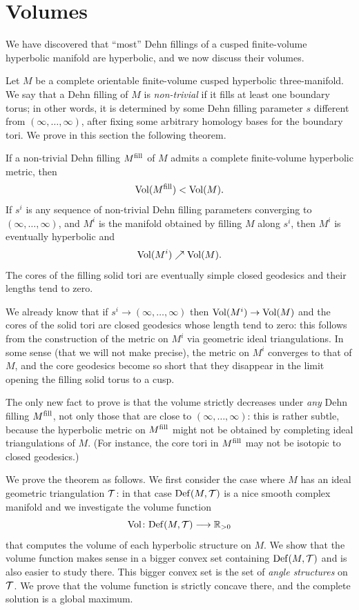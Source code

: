 \section{Volumes}
We have discovered that ``most'' Dehn fillings of a cusped finite-volume hyperbolic manifold are hyperbolic, and we now discuss their volumes.

Let $M$ be a complete orientable finite-volume cusped hyperbolic three-manifold. We say that  a Dehn filling of $M$ is \emph{non-trivial} if it fills at least one boundary torus; in other words, it is determined by some Dehn filling parameter $s$ different from $(\infty, \ldots, \infty)$, after fixing some arbitrary homology bases for the boundary tori. We prove in this section the following theorem. 

\begin{teo} \label{vol:vol:teo}
If a non-trivial Dehn filling $M^{\rm fill}$ of $M$ admits a complete finite-volume hyperbolic metric, then
$${\rm Vol}(M^{\rm fill}) < {\rm Vol}(M).$$
If $s^i$ is any sequence of non-trivial Dehn filling parameters converging to $(\infty,\ldots, \infty)$, and $M^i$ is the manifold obtained by filling $M$ along $s^i$, then $M^i$ is eventually hyperbolic and
$${\rm Vol} (M^i) \nearrow {\rm Vol}(M).$$
The cores of the filling solid tori are eventually simple closed geodesics and their lengths tend to zero.
\end{teo}

We already know that if $s^i \to (\infty, \ldots, \infty)$ then ${\rm Vol}(M^i) \to {\rm Vol}(M)$ and the cores of the solid tori are closed geodesics whose length tend to zero: this follows from the construction of the metric on $M^i$ via geometric ideal triangulations. In some sense (that we will not make precise), the metric on $M^i$ converges to that of $M$, and the core geodesics become so short that they disappear in the limit opening the filling solid torus to a cusp.

The only new fact to prove is that the volume strictly decreases under \emph{any} Dehn filling $M^{\rm fill}$, not only those that are close to $(\infty, \ldots, \infty)$: this is rather subtle, because the hyperbolic metric on $M^{\rm fill}$ might not be obtained by completing ideal triangulations of $M$. (For instance, the core tori in $M^{\rm fill}$ may not be isotopic to closed geodesics.)

We prove the theorem as follows. We first consider the case where $M$ has an ideal geometric triangulation $\mathcal{T}$: in that case ${\rm Def}(M,\mathcal{T})$ is a nice smooth complex manifold and we investigate the volume function 
$${\rm Vol}\colon {\rm Def}(M,\mathcal{T}) \longrightarrow \mathbb{R}_{>0}$$
that computes the volume of each hyperbolic structure on $M$. We show that the volume function makes sense in a bigger convex set containing ${\rm Def}(M,\mathcal{T})$ and is also easier to study there. This bigger convex set is the set of \emph{angle structures} on $\mathcal{T}$. We prove that the volume function is strictly concave there, and the complete solution is a global maximum. 

